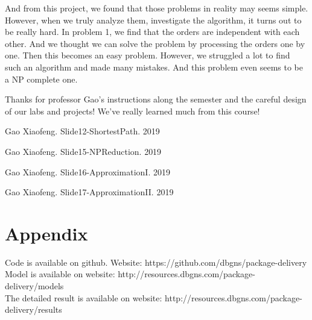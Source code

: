 \documentclass[11pt, a4paper]{article} %
\begin{document}
And from this project, we found that those problems in reality may seems simple. However, when we truly analyze them, investigate the algorithm, it turns out to be really hard. In problem 1, we find that the orders are independent with each other. And we thought we can solve the problem by processing the orders one by one. Then this becomes an easy problem. However, we struggled a lot to find such an algorithm and made many mistakes. And this problem even seems to be a NP complete one.

Thanks for professor Gao's instructions along the semester and the careful design of our labs and projects! We've really learned much from this course!


\newpage %
%


\begin{thebibliography}{99}
	 Gao Xiaofeng. Slide12-ShortestPath. 2019
	
	 Gao Xiaofeng. Slide15-NPReduction. 2019
	
	 Gao Xiaofeng. Slide16-ApproximationI. 2019
	
	 Gao Xiaofeng. Slide17-ApproximationII. 2019
\end{thebibliography}

\newpage %
\section*{Appendix} %
Code is available on github. Website: https://github.com/dbgns/package-delivery\\
Model is available on website: http://resources.dbgns.com/package-delivery/models\\
The detailed result is available on website: http://resources.dbgns.com/package-delivery/results
\end{document}
